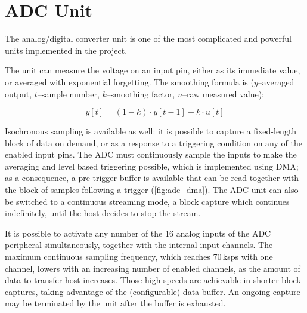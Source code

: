 \section{ADC Unit}

The analog/digital converter unit is one of the most complicated and powerful units implemented in the project.

The unit can measure the voltage on an input pin, either as its immediate value, or averaged with exponential forgetting. The smoothing formula is ($y$--averaged output, $t$--sample number, $k$--smoothing factor, $u$--raw measured value):

\begin{equation}
	y[t] = (1-k)\cdot y[t-1] + k\cdot u[t]
\end{equation}

Isochronous sampling is available as well: it is possible to capture a fixed-length block of data on demand, or as a response to a triggering condition on any of the enabled input pins. The \gls{ADC} must continuously sample the inputs to make the averaging and level based triggering possible, which is implemented using \gls{DMA}; as a consequence, a pre-trigger buffer is available that can be read together with the block of samples following a trigger (\cref{fig:adc_dma}). The \gls{ADC} unit can also be switched to a continuous streaming mode, a block capture which continues indefinitely, until the host decides to stop the stream.

It is possible to activate any number of the 16 analog inputs of the \gls{ADC} peripheral simultaneously, together with the internal input channels. The maximum continuous sampling frequency, which reaches 70\,ksps with one channel, lowers with an increasing number of enabled channels, as the amount of data to transfer host increases. Those high speeds are achievable in shorter block captures, taking advantage of the (configurable) data buffer. An ongoing capture may be terminated by the unit after the buffer is exhausted.

